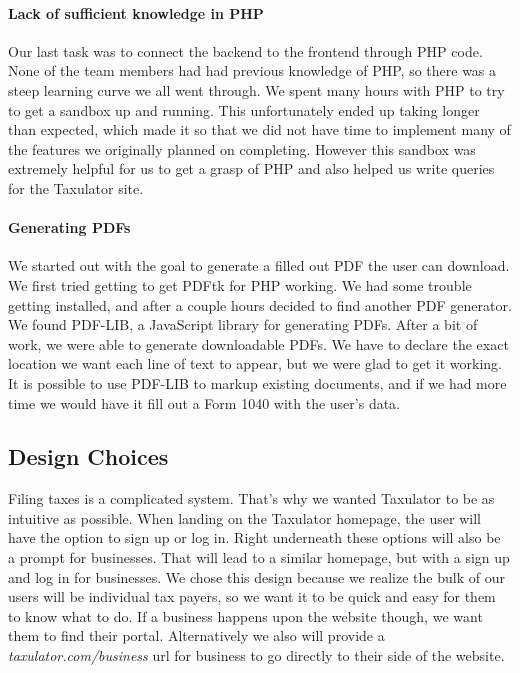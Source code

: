 \documentclass[sigconf]{acmart}
\begin{document}
\paragraph{Lack of sufficient knowledge in PHP}
Our last task was to connect the backend to the frontend through PHP code. None of the team members had had previous knowledge of PHP, so there was a steep learning curve we all went through. We spent many hours with PHP to try to get a sandbox up and running. This unfortunately ended up taking longer than expected, which made it so that we did not have time to implement many of the features we originally planned on completing. However this sandbox \cite{Sandbox} was extremely helpful for us to get a grasp of PHP and also helped us write queries for the Taxulator site.

\paragraph{Generating PDFs}
We started out with the goal to generate a filled out PDF the user can download. We first tried getting to get PDFtk for PHP working. We had some trouble getting installed, and after a couple hours decided to find another PDF generator. We found PDF-LIB, a JavaScript library for generating PDFs. After a bit of work, we were able to generate downloadable PDFs. We have to declare the exact location we want each line of text to appear, but we were glad to get it working. It is possible to use PDF-LIB to markup existing documents, and if we had more time we would have it fill out a Form 1040 with the user's data.

\subsection{Design Choices}
Filing taxes is a complicated system. That's why we wanted Taxulator to be as intuitive as possible. When landing on the Taxulator homepage, the user will have the option to sign up or log in. Right underneath these options will also be a prompt for businesses. That will lead to a similar homepage, but with a sign up and log in for businesses. We chose this design because we realize the bulk of our users will be individual tax payers, so we want it to be quick and easy for them to know what to do. If a business happens upon the website though, we want them to find their portal. Alternatively we also will provide a \textit{taxulator.com/business} url for business to go directly to their side of the website.
\end{document}
